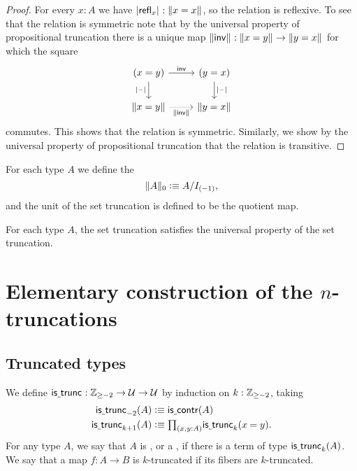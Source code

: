 \begin{proof}
For every $x:A$ we have $\bproj{\refl{x}}:\brck{x=x}$, so the relation is reflexive. To see that the relation is symmetric note that by the universal property of propositional truncation there is a unique map $\brck{\invfunc}:\brck{x=y}\to\brck{y=x}$ for which the square
\begin{equation*}
\begin{tikzcd}
(x=y) \arrow[r,"\invfunc"] \arrow[d,swap,"\bproj{\blank}"] & (y=x) \arrow[d,"\bproj{\blank}"] \\
\brck{x=y} \arrow[r,densely dotted,swap,"\brck{\invfunc}"] & \brck{y=x}
\end{tikzcd}
\end{equation*}
commutes. This shows that the relation is symmetric. Similarly, we show by the universal property of propositional truncation that the relation is transitive.
\end{proof}

\begin{defn}
For each type $A$ we define the 
\begin{equation*}
\trunc{0}{A}\defeq A/I_{(-1)},
\end{equation*}
and the unit of the set truncation is defined to be the quotient map.
\end{defn}

\begin{thm}
For each type $A$, the set truncation satisfies the universal property of the set truncation.
\end{thm}

\section{Elementary construction of the $n$-truncations}

\subsection{Truncated types}
\begin{defn}
We define $\istrunc{} : \Z_{\geq-2}\to\UU\to\UU$ by induction on $k:\Z_{\geq -2}$, taking
\begin{align*}
\istrunc{-2}(A) & \defeq \iscontr(A) \\
\istrunc{k+1}(A) & \defeq \prd{x,y:A}\istrunc{k}(\id{x}{y}).\qedhere
\end{align*}
For any type $A$, we say that $A$ is , or a , if there is a term of type $\istrunc{k}(A)$. We say that a map $f:A\to B$ is $k$-truncated if its fibers are $k$-truncated.
\end{defn}


